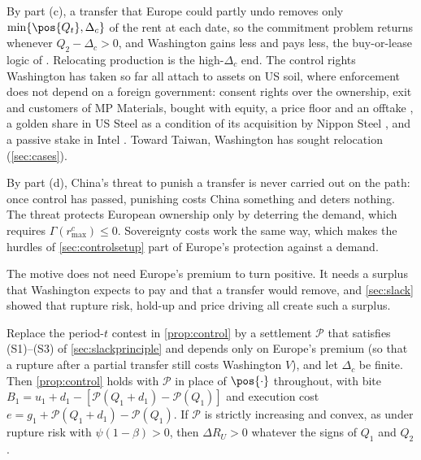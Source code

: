 By part (c), a transfer that Europe could partly undo removes only $\min\{\pos{Q_t},\Delta_c\}$ of the rent at each date, so the commitment problem returns whenever $Q_2-\Delta_c>0$, and Washington gains less and pays less, the buy-or-lease logic of \citet{harstad2016market}. Relocating production is the high-$\Delta_c$ end. The control rights Washington has taken so far all attach to assets on US soil, where enforcement does not depend on a foreign government: consent rights over the ownership, exit and customers of MP Materials, bought with equity, a price floor and an offtake \citep{mp2025dod}, a golden share in US Steel as a condition of its acquisition by Nippon Steel \citep{ussteel2025nsa}, and a passive stake in Intel \citep{intel2025agreement}. Toward Taiwan, Washington has sought relocation (\cref{sec:cases}).

By part (d), China's threat to punish a transfer is never carried out on the path: once control has passed, punishing costs China something and deters nothing. The threat protects European ownership only by deterring the demand, which requires $\Gamma(r^c_{\max})\le 0$. Sovereignty costs work the same way, which makes the hurdles of \cref{sec:controlsetup} part of Europe's protection against a demand.

The motive does not need Europe's premium to turn positive. It needs a surplus that Washington expects to pay and that a transfer would remove, and \cref{sec:slack} showed that rupture risk, hold-up and price driving all create such a surplus.

\begin{remark}\label{rem:controlsettle}
Replace the period-$t$ contest in \cref{prop:control} by a settlement $\mathcal P$ that satisfies (S1)--(S3) of \cref{sec:slackprinciple} and depends only on Europe's premium (so that a rupture after a partial transfer still costs Washington $V$), and let $\Delta_c$ be finite. Then \cref{prop:control} holds with $\mathcal P$ in place of $\pos{\cdot}$ throughout, with bite $B_1=u_1+d_1-[\mathcal P(Q_1+d_1)-\mathcal P(Q_1)]$ and execution cost $e=g_1+\mathcal P(Q_1+d_1)-\mathcal P(Q_1)$. If $\mathcal P$ is strictly increasing and convex, as under rupture risk with $\psi(1-\beta)>0$, then $\Delta R_U>0$ whatever the signs of $Q_1$ and $Q_2$.
\end{remark}

